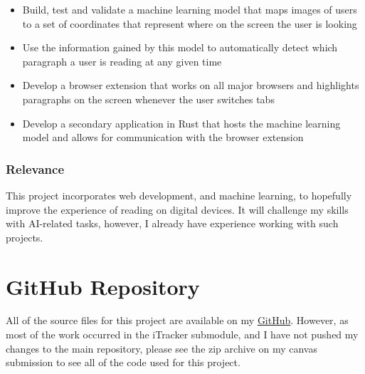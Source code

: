 \documentclass{report}
\begin{document}
\begin{itemize}
    \item Build, test and validate a machine learning model that maps images of users to a set of coordinates that represent where on the screen the user is looking 
    \item Use the information gained by this model to automatically detect which paragraph a user is reading at any given time 
    \item Develop a browser extension that works on all major browsers and highlights paragraphs on the screen whenever the user switches tabs 
    \item Develop a secondary application in Rust that hosts the machine learning model and allows for communication with the browser extension 
\end{itemize}

\subsection*{Relevance}

This project incorporates web development, and machine learning, to hopefully improve the experience of reading on digital devices. It will challenge my skills with AI-related tasks, however, I already have experience working with such projects. 

\chapter{GitHub Repository}

All of the source files for this project are available on my \href{https://github.com/Henry-Ash-Williams}{GitHub}. However, as most of the work occurred in the iTracker submodule, and I have not pushed my changes to the main repository, please see the zip archive on my canvas submission to see all of the code used for this project. 
\end{document}
